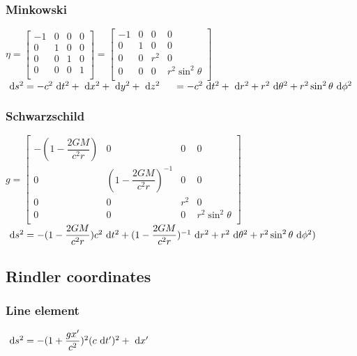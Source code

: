 \subsubsection{Minkowski}
\begin{itemize}
\itemt \( \eta =
\begin{bmatrix}
-1 	&0	&0	&0 	\\
0 	&1	&0	&0	\\
0 	&0	&1	&0	\\
0 	&0	&0	&1	\\
\end{bmatrix} =
\begin{bmatrix}
-1 	&0	&0	&0 	\\
0 	&1	&0	&0	\\
0 	&0	&r^2	&0	\\
0 	&0	&0	&r^2 \sin^2 \theta	\\
\end{bmatrix}\)
\itemt \( \dn s^2 = -c^2 \dn t^2 + \dn x^2 + \dn y^2 + \dn z^2 \tab[0.5cm]=  -c^2 \dn t^2 + \dn r^2 + r^2 \dn \theta ^2 + r^2 \sin^2 \theta \dn \phi^2 \)
\end{itemize}

\subsubsection{Schwarzschild}
\begin{itemize}
\itemt \( g =
\begin{bmatrix}
-(1-\dfrac{2GM}{c^2r}) 	&0							&0		&0 					\\
0 						&(1-\dfrac{2GM}{c^2r})^{-1}	&0		&0					\\
0 						&0							&r^2	&0					\\
0 						&0							&0		&r^2\sin^2\theta	\\
\end{bmatrix} \)
\itemt \( \dn s^2 = -(1-\dfrac{2GM}{c^2r})c^2 \dn t^2 + (1-\dfrac{2GM}{c^2r})^{-1} \dn r^2 + r^2 \dn \theta^2 + r^2\sin^2 \theta \dn \phi^2) \)
\end{itemize}

		\subsection{Rindler coordinates}

\subsubsection{Line element}
\begin{itemize}
\itemt \( \dn s^2 = -(1+\dfrac{gx'}{c^2})^2(c \dn t')^2 + \dn x' \)
\end{itemize}

